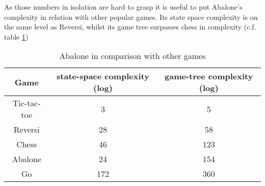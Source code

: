 As those numbers in isolation are hard to grasp it is useful to put Abalone's complexity in relation with other popular games. Its state space complexity is on the same level as Reversi, whilst its game tree surpasses chess in complexity (c.f. table \ref{complexity_table})

\begin{table}
    \begin{center}
        \begin{tabular}{ | c | c | c | }
            \hline
            Game        & state-space complexity (log) & game-tree complexity (log) \\
            \hline
            Tic-tac-toe & 3                            & 5                          \\
            \hline
            Reversi     & 28                           & 58                         \\
            \hline
            Chess       & 46                           & 123                        \\
            \hline
            Abalone     & 24                           & 154                        \\
            \hline
            Go          & 172                          & 360                        \\
            \hline
        \end{tabular}
    \end{center}
    \caption{Abalone in comparison with other games \cite{chorus_implementing_2009}}
    \label{complexity_table}
\end{table}